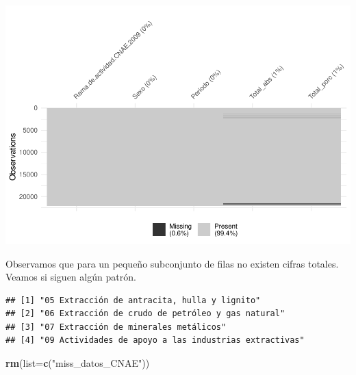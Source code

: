 \documentclass[notspecified,article,submit,moreauthors,pdftex]{Definitions/mdpi}
\newenvironment{Shaded}{\begin{snugshade}}{\end{snugshade}}
\newcommand{\AttributeTok}[1]{\textcolor[rgb]{0.13,0.29,0.53}{#1}}
\newcommand{\ConstantTok}[1]{\textcolor[rgb]{0.56,0.35,0.01}{#1}}
\newcommand{\DecValTok}[1]{\textcolor[rgb]{0.00,0.00,0.81}{#1}}
\newcommand{\FloatTok}[1]{\textcolor[rgb]{0.00,0.00,0.81}{#1}}
\newcommand{\FunctionTok}[1]{\textcolor[rgb]{0.13,0.29,0.53}{\textbf{#1}}}
\newcommand{\NormalTok}[1]{#1}
\newcommand{\OtherTok}[1]{\textcolor[rgb]{0.56,0.35,0.01}{#1}}
\newcommand{\SpecialCharTok}[1]{\textcolor[rgb]{0.81,0.36,0.00}{\textbf{#1}}}
\newcommand{\StringTok}[1]{\textcolor[rgb]{0.31,0.60,0.02}{#1}}
\begin{document}
\includegraphics{ProyectoAED2024_files/figure-latex/unnamed-chunk-14-1.pdf}

Observamos que para un pequeño subconjunto de filas no existen cifras
totales. Veamos si siguen algún patrón.

\begin{Shaded}
\end{Shaded}

\begin{verbatim}
## [1] "05 Extracción de antracita, hulla y lignito"         
## [2] "06 Extracción de crudo de petróleo y gas natural"    
## [3] "07 Extracción de minerales metálicos"                
## [4] "09 Actividades de apoyo a las industrias extractivas"
\end{verbatim}

\begin{Shaded}
\begin{Highlighting}[]
\FunctionTok{rm}\NormalTok{(}\AttributeTok{list=}\FunctionTok{c}\NormalTok{(}\StringTok{"miss\_datos\_CNAE"}\NormalTok{))}
\end{Highlighting}
\end{Shaded}
\end{document}
